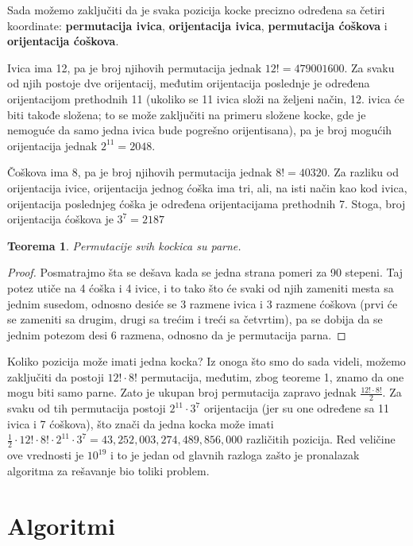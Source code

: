 \documentclass[a4paper]{article}
\newtheorem{teorema}{Teorema}
\begin{document}
Sada možemo zaključiti da je svaka pozicija kocke precizno određena sa četiri koordinate: \textbf{permutacija ivica}, \textbf{orijentacija ivica}, \textbf{permutacija ćoškova} i \textbf{orijentacija ćoškova}.

Ivica ima 12, pa je broj njihovih permutacija jednak $12! = 479 001 600$. Za svaku od njih postoje dve orijentacij, međutim orijentacija poslednje je određena orijentacijom prethodnih 11 (ukoliko se 11 ivica složi na željeni način, 12. ivica će biti takođe složena; to se može zaključiti na primeru složene kocke, gde je nemoguće da samo jedna ivica bude pogrešno orijentisana), pa je broj mogućih orijentacija jednak $2^{11} = 2048$.

Čoškova ima 8, pa je broj njihovih permutacija jednak $8! = 40320$. Za razliku od orijentacija ivice, orijentacija jednog ćoška ima tri, ali, na isti način kao kod ivica, orijentacija poslednjeg ćoška je određena orijentacijama prethodnih 7. Stoga, broj orijentacija ćoškova je $3^{7} = 2187$

\begin{teorema} Permutacije svih kockica su parne.
\end{teorema}
\begin{proof}
    Posmatrajmo šta se dešava kada se jedna strana pomeri za 90 stepeni. Taj potez utiče na 4 ćoška i 4 ivice, i to tako što će svaki od njih zameniti mesta sa jednim susedom, odnosno desiće se 3 razmene ivica i 3 razmene ćoškova (prvi će se zameniti sa drugim, drugi sa trećim i treći sa četvrtim), pa se dobija da se jednim potezom desi 6 razmena, odnosno da je permutacija parna.
\end{proof}

Koliko pozicija može imati jedna kocka? Iz onoga što smo do sada videli, možemo zaključiti da postoji $12! \cdot 8!$ permutacija, međutim, zbog teoreme 1, znamo da one mogu biti samo parne. Zato je ukupan broj permutacija zapravo jednak $\frac{12! \cdot 8!}{2}$. Za svaku od tih permutacija postoji $2^{11} \cdot 3^{7}$ orijentacija (jer su one određene sa 11 ivica i 7 ćoškova), što znači da jedna kocka može imati $\frac{1}{2} \cdot 12! \cdot 8! \cdot 2^{11} \cdot 3^7 = 43,252,003,274,489,856,000$ različitih pozicija. Red veličine ove vrednosti je $10^{19}$ i to je jedan od glavnih razloga zašto je pronalazak algoritma za rešavanje bio toliki problem.\cite{permutacije}




\section{Algoritmi}
\label{sec:algoritmi}
\end{document}
